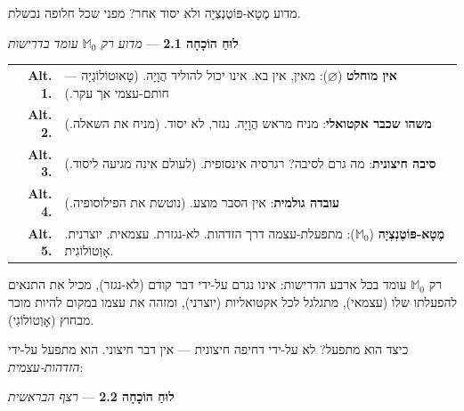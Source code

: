\documentclass[10pt, openany, oneside]{book}
\begin{document}
\vspace{1em}

\noindent מדוע מֶטָא-פּוֹטֶנְצְיָה ולא יסוד אחר? מפני שכל חלופה נכשלת.

\vspace{0.5em}

\textbf{לוּחַ הוֹכָחָה 2.1} --- \textit{מדוע רק $\mathbb{M}_0$ עומד בדרישות}

\vspace{0.5em}

\noindent\begin{tabular}{r p{}}
\textbf{Alt. 1.} & \textbf{אין מוחלט} ($\varnothing$): מאין, אין בא. אינו יכול להוליד הֲוָיָה. (טָאוּטוֹלוֹגְיָה — חותם-עצמי אך עקר.) \\[0.3em]
\textbf{Alt. 2.} & \textbf{משהו שכבר אקטואלי}: מניח מראש הֲוָיָה. נגזר, לא יסוד. (מניח את השאלה.) \\[0.3em]
\textbf{Alt. 3.} & \textbf{סיבה חיצונית}: מה גרם לסיבה? רגרסיה אינסופית. (לעולם אינה מגיעה ליסוד.) \\[0.3em]
\textbf{Alt. 4.} & \textbf{עובדה גולמית}: אין הסבר מוצע. (נוטשת את הפילוסופיה.) \\[0.3em]
\textbf{Alt. 5.} & \textbf{מֶטָא-פּוֹטֶנְצְיָה} ($\mathbb{M}_0$): מתפעלת-עצמה דרך הזדהות. לא-נגזרת. עצמאית. יוצרנית. אָוְטוֹלוֹגִית. \\[0.3em]
\end{tabular}

\vspace{0.8em}

\noindent רק $\mathbb{M}_0$ עומד בכל ארבע הדרישות: אינו נגרם על-ידי דבר קודם (לא-נגזר), מכיל את התנאים להפעלתו שלו (עצמאי), מתגלגל לכל אקטואליות (יוצרני), ומזהה את עצמו במקום להיות מוכר מבחוץ (אָוְטוֹלוֹגִי).

כיצד הוא מתפעל? לא על-ידי דחיפה חיצונית — אין דבר חיצוני. הוא מתפעל על-ידי \textit{הזדהות-עצמית}:

\vspace{0.5em}

\textbf{לוּחַ הוֹכָחָה 2.2} --- \textit{רצף הבראשית}

\vspace{0.5em}
\end{document}
